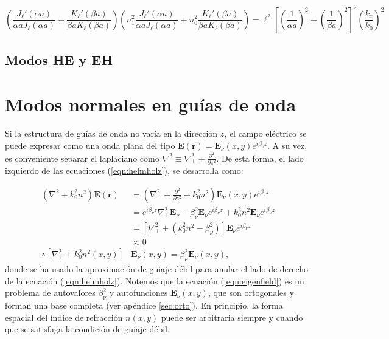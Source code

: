 \begin{equation}
	\left( \frac{J_\ell'(\alpha a)}{\alpha a J_\ell(\alpha a)} + \frac{K_\ell'(\beta a)}{\beta a K_\ell(\beta a)} \right)\left( n_1^2\frac{J_\ell'(\alpha a)}{\alpha a J_\ell(\alpha a)} + n_0^2\frac{K_\ell'(\beta a)}{\beta a K_\ell(\beta a)} \right) = \ell^2 \left[ \left(\frac{1}{\alpha a}\right)^2 + \left(\frac{1}{\beta a}\right)^2 \right]^2 \left( \frac{k_z}{k_0} \right)^2
\end{equation}

\subsection{Modos HE y EH}




\section{Modos normales en guías de onda}

Si la estructura de guías de onda no varía en la dirección $z$, el campo eléctrico se puede expresar como una onda plana del tipo $\textbf{E}(\textbf{r}) = \textbf{E}_\nu(x, y) e^{i\beta_\nu z}$. A su vez, es conveniente separar el laplaciano como $\nabla^2 \equiv \nabla_\perp^2 + \frac{\partial^2}{\partial z^2}$. De esta forma, el lado izquierdo de las ecuaciones (\ref{eqn:helmholz}), se desarrolla como:

\begin{align}
	(\nabla^2  + k_0^2n^2) \textbf{E}(\textbf{r}) &= \left(\nabla_\perp^2 + \frac{\partial^2}{\partial z^2} + k_0^2n^2\right) \textbf{E}_\nu(x, y)  e^{i\beta_\nu z} \nonumber
\\	
	&= e^{i\beta_\nu z} \nabla_\perp^2 \textbf{E}_\nu -\beta_\nu^2\textbf{E}_\nu e^{i\beta_\nu z} + k_0^2n^2 \textbf{E}_\nu  e^{i\beta_\nu z}
\nonumber	
	\\	
	&= \left[  \nabla_\perp^2  + (k_0^2n^2-\beta_\nu^2) \right]\textbf{E}_\nu  e^{i\beta_\nu z}
	\nonumber	
	\\
	&\approx
	0
	\nonumber
	\\
	\therefore
	 \left[  \nabla_\perp^2  + k_0^2n^2(x,y) \right]&\textbf{E}_\nu(x,y)  = \beta_\nu^2 \textbf{E}_\nu(x,y), \label{eqn:eigenfield}
\end{align}
donde se ha usado la aproximación de guiaje débil para anular el lado de derecho de la ecuación (\ref{eqn:helmholz}). Notemos que la ecuación (\ref{eqn:eigenfield}) es un problema de autovalores $\beta_\nu^2$ y autofunciones $\textbf{E}_\nu(x,y)$, que son ortogonales y forman una base completa (ver apéndice \ref{sec:orto}). En principio, la forma espacial del índice de refracción $n(x, y)$ puede ser arbitraria siempre y cuando que se satisfaga la condición de guiaje débil. 

